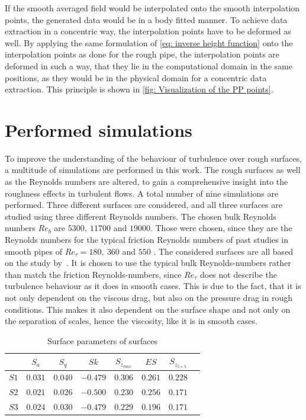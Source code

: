 If the smooth averaged field would be interpolated onto the smooth interpolation points, the generated data would be in a body fitted manner.
To achieve data extraction in a concentric way, the interpolation points have to be deformed as well. 
By applying the same formulation of \autoref{eq: inverse height function} onto the interpolation points as done for the rough pipe, the interpolation points are deformed in such a way, that they lie in the computational domain in the same positions, as they would be in the physical domain for a concentric data extraction. This principle is shown in \autoref{fig: Visualization of the PP points}.




\section{Performed simulations}\label{sec: performed simulations}
To improve the understanding of the behaviour of turbulence over rough surfaces, a multitude of simulations are performed in this work.
The rough surfaces as well as the Reynolds numbers are altered, to gain a comprehensive insight into the roughness effects in turbulent flows.
A total number of nine simulations are performed.
Three different surfaces are considered, and all three surfaces are studied using three different Reynolds numbers.
The chosen bulk Reynolds numbers $Re_b$ are $5300,\ 11700$ and $19000$.
Those were chosen, since they are the Reynolds numbers for the typical friction Reynolds numbers of past studies in smooth pipes of $Re_\tau = 180,\ 360$ and $550$ \citep{yaoDirectNumericalSimulations2023,elkhouryDirectNumericalSimulation2013,kimProgressPipeChannel2012}. 
The considered surfaces are all based on the study by~\cite{demaioDirectNumericalSimulation2023}.
It is chosen to use the typical bulk Reynolds-numbers rather than match the friction Reynolds-numbers, since $Re_\tau$ does not describe the turbulence behaviour as it does in smooth cases.
This is due to the fact, that it is not only dependent on the viscous drag, but also on the pressure drag in rough conditions.
This makes it also dependent on the surface shape and not only on the separation of scales, hence the viscosity, like it is in smooth cases.\\
\begin{table}
    \centering
    \begin{tabular}{c c c c c c c c}
        \hline
                & $S_a$     & $S_q$     & $Sk$      & $S_{z_{max}}$ & $ES$      & $S_{z_{5 \times 5}}$\\
        \hline
        $S1$    & $0.031$   & $0.040$   & $-0.479$  & $0.306$       & $0.261$   & $0.228$ \\
        $S2$    & $0.021$   & $0.026$   & $-0.500$  & $0.230$       & $0.256$   & $0.171$ \\
        $S3$   & $0.024$   & $0.030$   & $-0.479$  & $0.229$       & $0.196$   & $0.171$ \\
        \hline
    \end{tabular}
    \caption{Surface parameters of surfaces}
    \label{tab: surface parameters of production runs}
\end{table}
